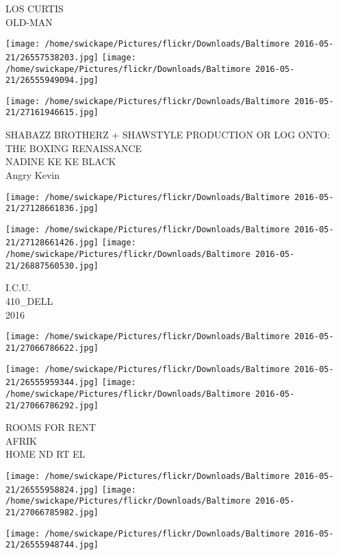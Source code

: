 \documentclass[10pt,letterpaper]{article}
\begin{document}
LOS CURTIS\\
OLD{-}MAN\\
\pagebreak

\texttt{[image: /home/swickape/Pictures/flickr/Downloads/Baltimore 2016-05-21/26557538203.jpg]}
\texttt{[image: /home/swickape/Pictures/flickr/Downloads/Baltimore 2016-05-21/26555949094.jpg]}

\texttt{[image: /home/swickape/Pictures/flickr/Downloads/Baltimore 2016-05-21/27161946615.jpg]}

SHABAZZ BROTHERZ + SHAWSTYLE PRODUCTION OR LOG ONTO: THE BOXING RENAISSANCE\\
NADINE KE KE BLACK\\
Angry Kevin\\
\pagebreak

\texttt{[image: /home/swickape/Pictures/flickr/Downloads/Baltimore 2016-05-21/27128661836.jpg]}

\vspace{0.25in}
\texttt{[image: /home/swickape/Pictures/flickr/Downloads/Baltimore 2016-05-21/27128661426.jpg]}
\texttt{[image: /home/swickape/Pictures/flickr/Downloads/Baltimore 2016-05-21/26887560530.jpg]}

I.C.U.\\
410\_DELL\\
2016\\
\pagebreak

\texttt{[image: /home/swickape/Pictures/flickr/Downloads/Baltimore 2016-05-21/27066786622.jpg]}

\vspace{0.25in}
\texttt{[image: /home/swickape/Pictures/flickr/Downloads/Baltimore 2016-05-21/26555959344.jpg]}
\texttt{[image: /home/swickape/Pictures/flickr/Downloads/Baltimore 2016-05-21/27066786292.jpg]}

ROOMS FOR RENT\\
AFRIK\\
HOME ND RT EL\\
\pagebreak

\texttt{[image: /home/swickape/Pictures/flickr/Downloads/Baltimore 2016-05-21/26555958824.jpg]}
\texttt{[image: /home/swickape/Pictures/flickr/Downloads/Baltimore 2016-05-21/27066785982.jpg]}

\vspace{0.25in}
\texttt{[image: /home/swickape/Pictures/flickr/Downloads/Baltimore 2016-05-21/26555948744.jpg]}
\end{document}
